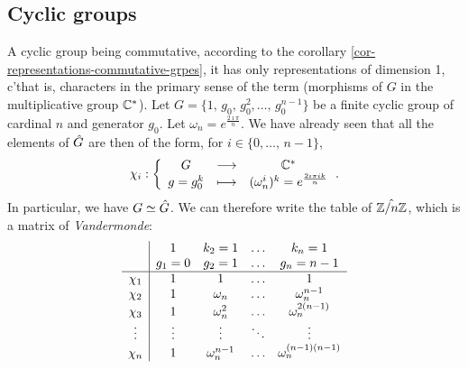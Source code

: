 \subsection{Cyclic groups}
 
  A cyclic group being commutative, according to the corollary \ref{cor-representations-commutative-grpes}, it has only representations of dimension 1, c'that is, characters in the primary sense of the term (morphisms of $ G $ in the multiplicative group $ \mathbb{C}^* $). Let $ G = \{1, \, g_0, \, g_0^2, \ldots, \, g_0^{n-1}\} $ be a finite cyclic group of cardinal $ n $ and generator $ g_0 $. Let $ \omega_n = e^{\frac{2 \imath \pi}{n}} $. We have already seen that all the elements of $ \hat{G} $ are then of the form, for $ i \in \{0, \ldots, \, n-1\} $,
\begin{equation*}
\chi_i: {\left\{ \begin{array}{ccc} G & \longrightarrow & \mathbb{C}^* \\ g = g_0^k & \longmapsto & (\omega_n^i)^k = e^{\frac{2 \imath \pi ik}{n}} \end{array} \right.}.
\end{equation*}
In particular, we have $ G \simeq \hat{G} $. We can therefore write the table of $ \hat{\mathbb{Z}/n \mathbb{Z}} $, which is a matrix of \textit{Vandermonde}:
\begin{equation*}
\begin{array}{c | cccc} & 1 & k_2 = 1 & \ldots & k_n = 1 \\& g_1 = 0 & g_2 = 1 & \ldots & g_n = n-1 \\\hline \chi_1 & 1 & 1 & \ldots & 1 \\\chi_2 & 1 & \omega_n & \ldots & \omega_n^{n-1} \\\chi_3 & 1 & \omega_n^2 & \ldots & \omega_n^{2 (n-1)} \\\vdots & \vdots & \vdots & \ddots & \vdots \\\chi_n & 1 & \omega_n^{n-1} & \ldots & \omega_n^{(n-1) (n-1)} \\\end{array}
\end{equation*}
 

